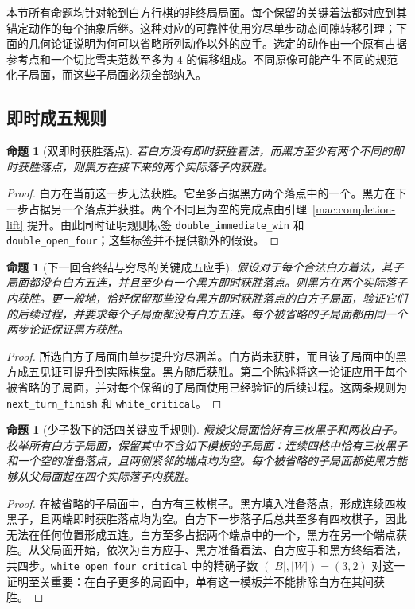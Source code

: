 \documentclass[11pt]{article}
\newtheorem{proposition}[theorem]{命题}
\theoremstyle{definition}
\theoremstyle{remark}
\begin{document}
本节所有命题均针对轮到白方行棋的非终局局面。每个保留的关键着法都对应到其锚定动作的每个抽象后继。这种对应的可靠性使用穷尽单步动态间隙转移引理；下面的几何论证说明为何可以省略所列动作以外的应手。选定的动作由一个原有占据参考点和一个切比雪夫范数至多为 4 的偏移组成。不同原像可能产生不同的规范化子局面，而这些子局面必须全部纳入。

\subsection{即时成五规则}

\begin{proposition}[双即时获胜落点]\label{mac:double-completion}
若白方没有即时获胜着法，而黑方至少有两个不同的即时获胜落点，则黑方在接下来的两个实际落子内获胜。

\end{proposition}
\begin{proof}
白方在当前这一步无法获胜。它至多占据黑方两个落点中的一个。黑方在下一步占据另一个落点并获胜。两个不同且为空的完成点由引理~\ref{mac:completion-lift} 提升。由此同时证明规则标签 \texttt{double\_immediate\_win} 和 \texttt{double\_open\_four}；这些标签并不提供额外的假设。
\end{proof}

\begin{proposition}[下一回合终结与穷尽的关键成五应手]\label{mac:finish-critical}
假设对于每个合法白方着法，其子局面都没有白方五连，并且至少有一个黑方即时获胜落点。则黑方在两个实际落子内获胜。更一般地，恰好保留那些没有黑方即时获胜落点的白方子局面，验证它们的后续过程，并要求每个子局面都没有白方五连。每个被省略的子局面都由同一个两步论证保证黑方获胜。

\end{proposition}
\begin{proof}
所选白方子局面由单步提升穷尽涵盖。白方尚未获胜，而且该子局面中的黑方成五见证可提升到实际棋盘。黑方随后获胜。第二个陈述将这一论证应用于每个被省略的子局面，并对每个保留的子局面使用已经验证的后续过程。这两条规则为 \texttt{next\_turn\_finish} 和 \texttt{white\_critical}。
\end{proof}

\begin{proposition}[少子数下的活四关键应手规则]\label{mac:small-open-four}
假设父局面恰好有三枚黑子和两枚白子。枚举所有白方子局面，保留其中不含如下模板的子局面：连续四格中恰有三枚黑子和一个空的准备落点，且两侧紧邻的端点均为空。每个被省略的子局面都使黑方能够从父局面起在四个实际落子内获胜。

\end{proposition}
\begin{proof}
在被省略的子局面中，白方有三枚棋子。黑方填入准备落点，形成连续四枚黑子，且两端即时获胜落点均为空。白方下一步落子后总共至多有四枚棋子，因此无法在任何位置形成五连。白方至多占据两个端点中的一个，黑方在另一个端点获胜。从父局面开始，依次为白方应手、黑方准备着法、白方应手和黑方终结着法，共四步。\texttt{white\_open\_four\_critical} 中的精确子数 \((|B|,|W|)=(3,2)\) 对这一证明至关重要：在白子更多的局面中，单有这一模板并不能排除白方在其间获胜。
\end{proof}
\end{document}
